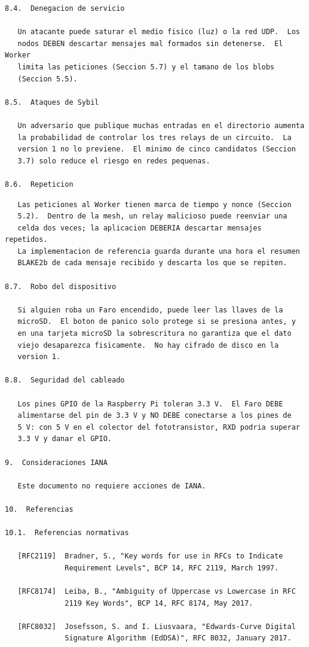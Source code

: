 \begin{Verbatim}
8.4.  Denegacion de servicio

   Un atacante puede saturar el medio fisico (luz) o la red UDP.  Los
   nodos DEBEN descartar mensajes mal formados sin detenerse.  El Worker
   limita las peticiones (Seccion 5.7) y el tamano de los blobs
   (Seccion 5.5).

8.5.  Ataques de Sybil

   Un adversario que publique muchas entradas en el directorio aumenta
   la probabilidad de controlar los tres relays de un circuito.  La
   version 1 no lo previene.  El minimo de cinco candidatos (Seccion
   3.7) solo reduce el riesgo en redes pequenas.

8.6.  Repeticion
\end{Verbatim}
\newpage
\begin{Verbatim}
   Las peticiones al Worker tienen marca de tiempo y nonce (Seccion
   5.2).  Dentro de la mesh, un relay malicioso puede reenviar una
   celda dos veces; la aplicacion DEBERIA descartar mensajes repetidos.
   La implementacion de referencia guarda durante una hora el resumen
   BLAKE2b de cada mensaje recibido y descarta los que se repiten.

8.7.  Robo del dispositivo

   Si alguien roba un Faro encendido, puede leer las llaves de la
   microSD.  El boton de panico solo protege si se presiona antes, y
   en una tarjeta microSD la sobrescritura no garantiza que el dato
   viejo desaparezca fisicamente.  No hay cifrado de disco en la
   version 1.

8.8.  Seguridad del cableado

   Los pines GPIO de la Raspberry Pi toleran 3.3 V.  El Faro DEBE
   alimentarse del pin de 3.3 V y NO DEBE conectarse a los pines de
   5 V: con 5 V en el colector del fototransistor, RXD podria superar
   3.3 V y danar el GPIO.

9.  Consideraciones IANA

   Este documento no requiere acciones de IANA.

10.  Referencias

10.1.  Referencias normativas

   [RFC2119]  Bradner, S., "Key words for use in RFCs to Indicate
              Requirement Levels", BCP 14, RFC 2119, March 1997.

   [RFC8174]  Leiba, B., "Ambiguity of Uppercase vs Lowercase in RFC
              2119 Key Words", BCP 14, RFC 8174, May 2017.

   [RFC8032]  Josefsson, S. and I. Liusvaara, "Edwards-Curve Digital
              Signature Algorithm (EdDSA)", RFC 8032, January 2017.


\end{Verbatim}
